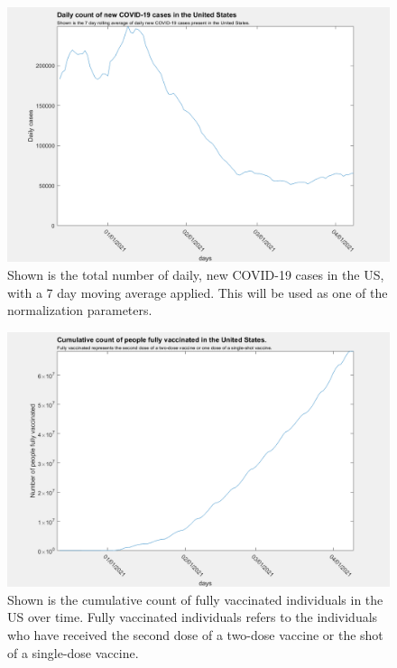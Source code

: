 \documentclass[twoside]{article}
\begin{document}
\begin{multicols}{2}
\begin{figure}[H]
	\includegraphics[width=\linewidth]{images/usa_daily_cases_processed.png}
	\caption{Shown is the total number of daily, new COVID-19 cases in the US, with a 7 day moving average applied. This will be used as one of the normalization parameters.}
	\label{fig:images/usa_daily_cases_processedLabel}
\end{figure}

\begin{figure}[H]
	\includegraphics[width=\linewidth]{images/usa_vac_cumulative.png}
	\caption{Shown is the cumulative count of fully vaccinated individuals in the US over time. Fully vaccinated individuals refers to the individuals who have received the second dose of a two-dose vaccine or the shot of a single-dose vaccine.}
	\label{fig:images/usa_vac_cumulativeLabel}
\end{figure}


\end{multicols}
\end{document}
